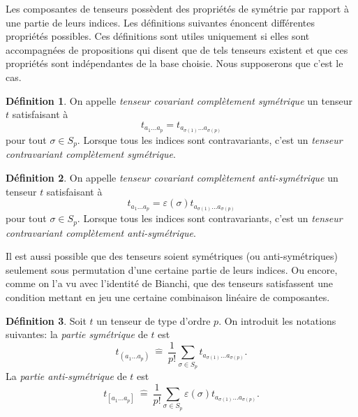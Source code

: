 \documentclass[a4paper,11pt]{report}
\theoremstyle{definition}
\theoremstyle{plain}
\theoremstyle{definition}
\newtheorem{defn}{Définition}[chapter]
\theoremstyle{remark}
\begin{document}
                Les composantes de tenseurs possèdent des propriétés de symétrie par rapport à une partie de leurs indices. Les définitions suivantes énoncent différentes propriétés possibles. Ces définitions sont utiles uniquement si elles sont accompagnées de propositions qui disent que de tels tenseurs existent et que ces propriétés sont indépendantes de la base choisie. Nous supposerons que c'est le cas.
                
                \begin{defn}
                    On appelle \textit{tenseur covariant complètement symétrique} un tenseur $t$ satisfaisant à
                    \begin{equation}
                            t_{a_1\dots a_p} = t_{a_{\sigma(1)}\dots a_{\sigma(p)}}
                    \end{equation}
                    pour tout $\sigma\in S_p$. Lorsque tous les indices sont contravariants, c'est un \textit{tenseur contravariant complètement symétrique}.
                \end{defn}
                
                \begin{defn}
                    On appelle \textit{tenseur covariant complètement anti-symétrique} un tenseur $t$ satisfaisant à
                    \begin{equation}
                            t_{a_1\dots a_p} = \varepsilon(\sigma)t_{a_{\sigma(1)}\dots a_{\sigma(p)}}
                    \end{equation}
                    pour tout $\sigma\in S_p$. Lorsque tous les indices sont contravariants, c'est un \textit{tenseur contravariant complètement anti-symétrique}.
                \end{defn}
                
                Il est aussi possible que des tenseurs soient symétriques (ou anti-symétriques) seulement sous permutation d'une certaine partie de leurs indices. Ou encore, comme on l'a vu avec l'identité de Bianchi, que des tenseurs satisfassent une condition mettant en jeu une certaine combinaison linéaire de composantes.\\
                
                \begin{defn}
                    Soit $t$ un tenseur de type d'ordre $p$. On introduit les notations suivantes: la \textit{partie symétrique} de $t$ est 
                    \begin{equation}
                        t_{(a_1\dots a_p)} ~\hat{=}~ \frac{1}{p!} \sum_{\sigma\in S_p}t_{a_{\sigma(1)}\dots a_{\sigma(p)}}.
                    \end{equation}
                    La \textit{partie anti-symétrique} de $t$ est 
                    \begin{equation}
                        t_{[a_1\dots a_p]} ~\hat{=}~ \frac{1}{p!} \sum_{\sigma\in S_p}\varepsilon(\sigma) t_{a_{\sigma(1)}\dots a_{\sigma(p)}}.
                    \end{equation}
                 \end{defn}
                
\end{document}
